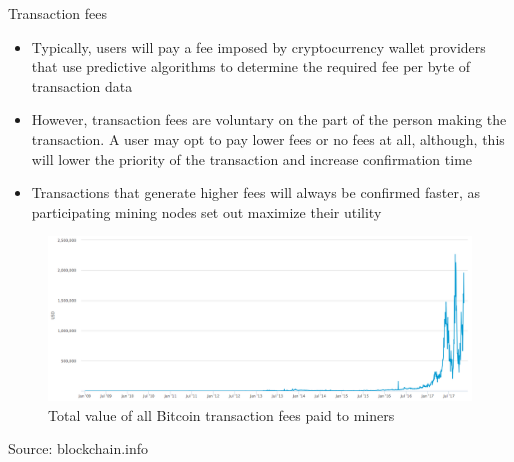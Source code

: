 \documentclass[10pt]{beamer}
\begin{document}
\begin{frame}{Transaction fees}
	\begin{itemize}
		\item Typically, users will pay a fee imposed by cryptocurrency wallet providers that use predictive algorithms to determine the required fee per byte of transaction data
		\item However, transaction fees are voluntary on the part of the person making the transaction. A user may opt to pay lower fees or no fees at all, although, this will lower the priority of the transaction and increase confirmation time
		\item Transactions that generate higher fees will always be confirmed faster, as participating mining nodes set out maximize their utility
	\end{itemize}
\end{frame}


\begin{frame}
	\begin{scriptsize}
	\end{scriptsize}
	\begin{figure}[]
		\centering
		\includegraphics  [scale=0.25]{Images/transaction-fees}
		\caption{	Total value of all Bitcoin transaction fees paid to miners}
	\end{figure}
	\begin{tiny}
		Source: blockchain.info
	\end{tiny}
\end{frame}

\end{document}
